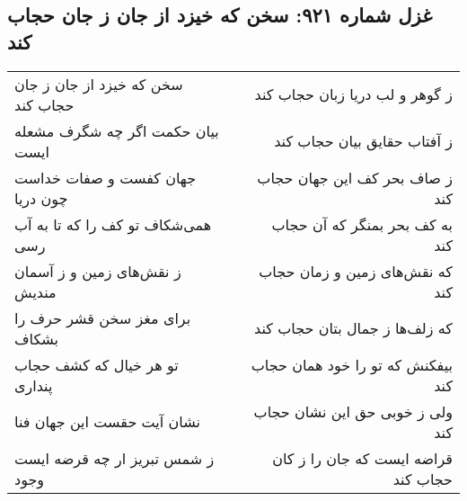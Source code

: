 \begin{center}
\section*{غزل شماره ۹۲۱: سخن که خیزد از جان ز جان حجاب کند}
\label{sec:0921}
\begin{longtable}{l p{0.5cm} r}
سخن که خیزد از جان ز جان حجاب کند
&&
ز گوهر و لب دریا زبان حجاب کند
\\
بیان حکمت اگر چه شگرف مشعله ایست
&&
ز آفتاب حقایق بیان حجاب کند
\\
جهان کفست و صفات خداست چون دریا
&&
ز صاف بحر کف این جهان حجاب کند
\\
همی‌شکاف تو کف را که تا به آب رسی
&&
به کف بحر بمنگر که آن حجاب کند
\\
ز نقش‌های زمین و ز آسمان مندیش
&&
که نقش‌های زمین و زمان حجاب کند
\\
برای مغز سخن قشر حرف را بشکاف
&&
که زلف‌ها ز جمال بتان حجاب کند
\\
تو هر خیال که کشف حجاب پنداری
&&
بیفکنش که تو را خود همان حجاب کند
\\
نشان آیت حقست این جهان فنا
&&
ولی ز خوبی حق این نشان حجاب کند
\\
ز شمس تبریز ار چه قرضه ایست وجود
&&
قراضه ایست که جان را ز کان حجاب کند
\\
\end{longtable}
\end{center}
